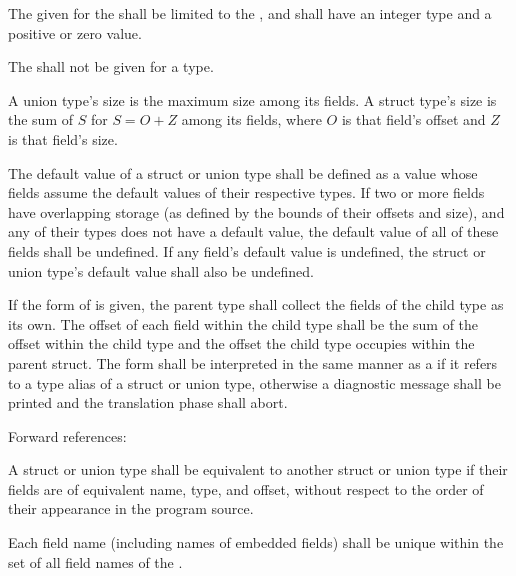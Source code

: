 \specsubsubitem
The  given for the  shall
be limited to the , and
shall have an integer type and a positive or zero value.

\specsubsubitem
The  shall not be given for a 
type.

\specsubsubitem
A union type's size is the maximum size among its fields. A struct type's size
is the sum of $S$ for $S = O+Z$ among its fields, where $O$ is that
field's offset and $Z$ is that field's size.

\specsubsubitem
The default value of a struct or union type shall be defined as a value whose
fields assume the default values of their respective types. If two or more
fields have overlapping storage (as defined by the bounds of their offsets and
size), and any of their types does not have a default value, the default value
of all of these fields shall be undefined. If any field's default value is
undefined, the struct or union type's default value shall also be undefined.

\specsubsubitem
If the  form of 
is given, the parent type shall collect the fields of the child type as its
own. The offset of each field within the child type shall be the sum of the
offset within the child type and the offset the child type occupies within the
parent struct. The  form shall be interpreted in the same
manner as a  if it refers to a type alias of a
struct or union type, otherwise a diagnostic message shall be printed and the
translation phase shall abort.

Forward references: 

\specsubsubitem
A struct or union type shall be equivalent to another struct or union type if
their fields are of equivalent name, type, and offset, without respect to the
order of their appearance in the program source.


\specsubsubitem
Each field name (including names of embedded fields) shall be unique within the
set of all field names of the .

